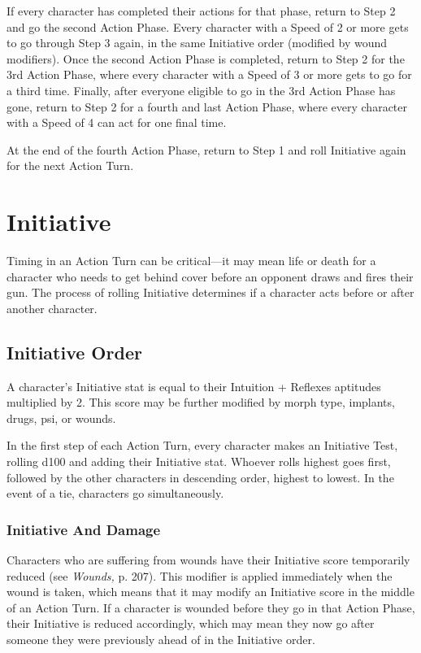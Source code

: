 If every character has completed their actions 
for that phase, return to Step 2 and go the second 
Action Phase. Every character with a Speed of 2 or 
more gets to go through Step 3 again, in the same 
Initiative order (modified by wound modifiers). 
Once the second Action Phase is completed, return 
to Step 2 for the 3rd Action Phase, where every 
character with a Speed of 3 or more gets to go for 
a third time. Finally, after everyone eligible to go in 
the 3rd Action Phase has gone, return to Step 2 for 
a fourth and last Action Phase, where every character
with a Speed of 4 can act for one final time.

At the end of the fourth Action Phase, return to Step 
1 and roll Initiative again for the next Action Turn.

\section{Initiative}

Timing in an Action Turn can be critical—it may mean 
life or death for a character who needs to get behind 
cover before an opponent draws and fires their gun. 
The process of rolling Initiative determines if a character
acts before or after another character.

\subsection{Initiative Order}

A character's Initiative stat is equal to their Intuition + 
Reflexes aptitudes multiplied by 2. This score may be 
further modified by morph type, implants, drugs, psi, 
or wounds.

In the first step of each Action Turn, every character
makes an Initiative Test, rolling d100 and adding
their Initiative stat. Whoever rolls highest goes first, 
followed by the other characters in descending order, 
highest to lowest. In the event of a tie, characters go 
simultaneously.

\subsubsection{Initiative And Damage}

Characters who are suffering from wounds have their 
Initiative score temporarily reduced (see \textit{Wounds,} p. 
207). This modifier is applied immediately when the 
wound is taken, which means that it may modify an 
Initiative score in the middle of an Action Turn. If a 
character is wounded before they go in that Action 
Phase, their Initiative is reduced accordingly, which 
may mean they now go after someone they were previously
ahead of in the Initiative order.

